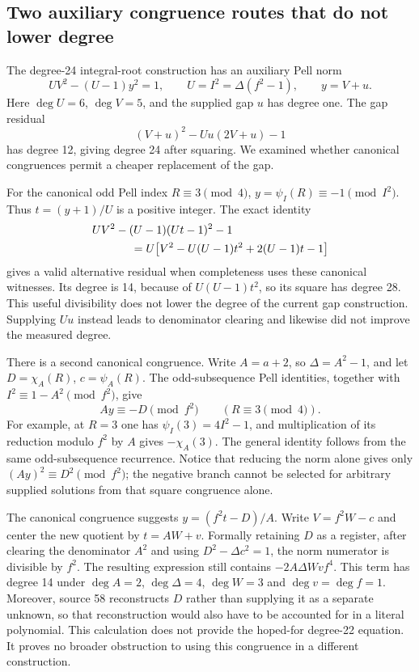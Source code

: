 \subsection{Two auxiliary congruence routes that do not lower degree}

The degree-24 integral-root construction has an auxiliary Pell norm
\[
 U V^2-(U-1)y^2=1,
 \qquad U=I^2=\Delta(f^2-1),
 \qquad y=V+u.
\]
Here \(\deg U=6\), \(\deg V=5\), and the supplied gap \(u\) has degree
one.  The gap residual
\[
 (V+u)^2-Uu(2V+u)-1
\]
has degree 12, giving degree 24 after squaring.  We examined whether
canonical congruences permit a cheaper replacement of the gap.

For the canonical odd Pell index \(R\equiv3\pmod4\),
\(y=\psi_I(R)\equiv-1\pmod{I^2}\).  Thus
\(t=(y+1)/U\) is a positive integer.  The exact identity
\begin{align*}
 &U V^2-(U-1)(Ut-1)^2-1\\
 &\hspace{12mm}=
 U\bigl[V^2-U(U-1)t^2+2(U-1)t-1\bigr]
\end{align*}
gives a valid alternative residual when completeness uses these canonical
witnesses.  Its degree is 14, because of \(U(U-1)t^2\), so its square has
degree 28.  This useful divisibility does not lower the degree of the
current gap construction.  Supplying \(Uu\) instead leads to denominator
clearing and likewise did not improve the measured degree.

There is a second canonical congruence.  Write
\(A=a+2\), so \(\Delta=A^2-1\), and let
\(D=\chi_A(R)\), \(c=\psi_A(R)\).  The odd-subsequence Pell
identities, together with
\(I^2\equiv1-A^2\pmod{f^2}\), give
\[
 Ay\equiv-D\pmod{f^2}
 \qquad(R\equiv3\pmod4).
\]
For example, at \(R=3\) one has
\(\psi_I(3)=4I^2-1\), and multiplication of its reduction modulo
\(f^2\) by \(A\) gives \(-\chi_A(3)\).  The general identity follows
from the same odd-subsequence recurrence.  Notice that reducing the norm
alone gives only \((Ay)^2\equiv D^2\pmod{f^2}\); the negative branch
cannot be selected for arbitrary supplied solutions from that square
congruence alone.

The canonical congruence suggests
\(y=(f^2t-D)/A\).  Write \(V=f^2W-c\) and center the new quotient by
\(t=AW+v\).  Formally retaining \(D\) as a register, after clearing the
denominator \(A^2\) and using \(D^2-\Delta c^2=1\), the norm numerator
is divisible by \(f^2\).  The resulting expression still contains
\(-2A\Delta Wv f^4\).  This term has degree 14 under
\(\deg A=2\), \(\deg\Delta=4\), \(\deg W=3\) and
\(\deg v=\deg f=1\).  Moreover, source 58 reconstructs \(D\) rather
than supplying it as a separate unknown, so that reconstruction would also
have to be accounted for in a literal polynomial.  This calculation does
not provide the hoped-for degree-22 equation.  It proves no broader
obstruction to using this congruence in a different construction.

